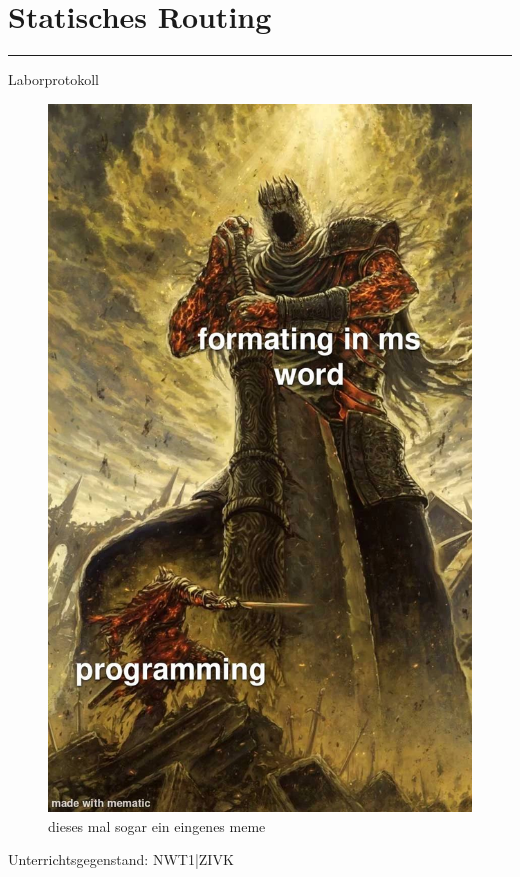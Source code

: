 \documentclass[a4paper]{article}
\begin{document}
\pagestyle{oida}
\section*{Statisches Routing}
\par\noindent\rule{\textwidth}{0.4pt}

Laborprotokoll

\begin{figure}[h]
	\includegraphics[scale=0.6]{meme.jpeg}
	\caption{dieses mal sogar ein eingenes meme}
\end{figure}

\vspace*{\fill}
Unterrichtsgegenstand:	NWT1|ZIVK
\end{document}
